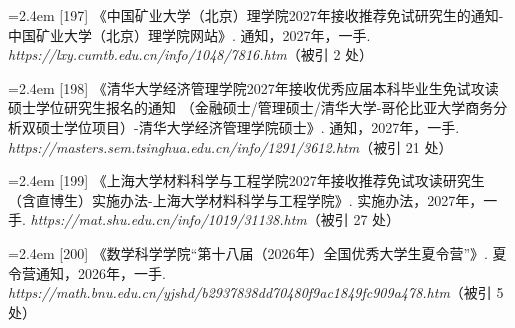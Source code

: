 {\vspace{0.6pt}
\vspace{3.5pt}\par
\nopagebreak\vspace{1pt}
\noindent\hangindent=2.4em \label{src:S0251}{\color{cAccent}[197]} 《中国矿业大学（北京）理学院2027年接收推荐免试研究生的通知-中国矿业大学（北京）理学院网站》. 通知，2027年，一手. \textit{https://lxy.cumtb.edu.cn/info/1048/7816.htm}（被引 2 处）\par
\vspace{0.6pt}
\vspace{3.5pt}\par
\nopagebreak\vspace{1pt}
\noindent\hangindent=2.4em \label{src:S0254}{\color{cAccent}[198]} 《清华大学经济管理学院2027年接收优秀应届本科毕业生免试攻读硕士学位研究生报名的通知 （金融硕士/管理硕士/清华大学-哥伦比亚大学商务分析双硕士学位项目）-清华大学经济管理学院硕士》. 通知，2027年，一手. \textit{https://masters.sem.tsinghua.edu.cn/info/1291/3612.htm}（被引 21 处）\par
\vspace{0.6pt}
\vspace{3.5pt}\par
\nopagebreak\vspace{1pt}
\noindent\hangindent=2.4em \label{src:S0256}{\color{cAccent}[199]} 《上海大学材料科学与工程学院2027年接收推荐免试攻读研究生（含直博生）实施办法-上海大学材料科学与工程学院》. 实施办法，2027年，一手. \textit{https://mat.shu.edu.cn/info/1019/31138.htm}（被引 27 处）\par
\vspace{0.6pt}
\vspace{3.5pt}\par
\nopagebreak\vspace{1pt}
\noindent\hangindent=2.4em \label{src:S0257}{\color{cAccent}[200]} 《数学科学学院“第十八届（2026年）全国优秀大学生夏令营”》. 夏令营通知，2026年，一手. \textit{https://math.bnu.edu.cn/yjshd/b2937838dd70480f9ac1849fc909a478.htm}（被引 5 处）\par
\vspace{0.6pt}
\vspace{3.5pt}\par
\nopagebreak\vspace{1pt}
}
